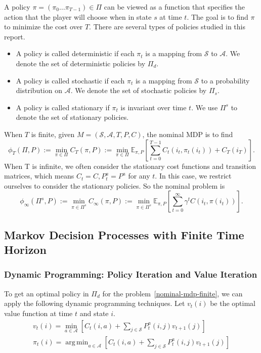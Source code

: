 \documentclass[11pt,reqno]{amsart}
\theoremstyle{definition}
\numberwithin{equation}{section}
\theoremstyle{remark}
\DeclareMathOperator*{\argmin}{arg\,min}
\begin{document}
\medskip

 A policy $\pi=(\pi_0\ldots\pi_{T-1})\in\Pi$ can be viewed as a function that specifies the action that the player will choose when in state $s$ at time $t$. The goal is to find $\pi$ to minimize the cost over $T$. There are several types of policies studied in this report. 
 \begin{itemize}
     \item A policy is called deterministic if each $\pi_t$ is a mapping from $\mathcal{S}$ to $\mathcal{A}$. We denote the set of deterministic policies by $\Pi_d$.
     \item A policy is called stochastic if each $\pi_t$ is a mapping from $\mathcal{S}$ to a probability distribution on $\mathcal{A}$. We denote the set of stochastic policies by $\Pi_s$.
     \item A policy is called stationary if $\pi_t$ is invariant over time $t$.  We use $\Pi^s$ to denote the set of stationary policies.
 \end{itemize}

\medskip

When $T$ is finite, given $M = (\mathcal{S}, \mathcal{A}, T, P, C)$, the nominal MDP is to find
\begin{equation}\label{nominal-mdp-finite}
    \phi_T(\Pi,P):=\min_{\pi\in\Pi}C_T(\pi,P):=\min_{\pi\in\Pi}\mathbb{E}_{\pi,P} \left[\sum_{t=0}^{T-1} C_t(i_t, \pi_t(i_t))+C_T(i_T)\right].
\end{equation}
When T is infinite, we often consider the stationary cost functions and transition matrices, which means $C_t=C,P^a_t=P^a$ for any $t$. In this case, we restrict ourselves to consider the stationary policies. So the nominal problem is
\begin{equation}\label{nominal-mdp-infinite}
    \phi_\infty(\Pi^s,P):=\min_{\pi\in\Pi^s}C_\infty(\pi,P):=\min_{\pi\in\Pi^s}\mathbb{E}_{\pi,P} \left[\sum_{t=0}^{\infty}\gamma^t C(i_t, \pi(i_t))\right].
\end{equation}


\subsection{Markov Decision Processes with Finite Time Horizon}


\subsubsection{Dynamic Programming: Policy Iteration and Value Iteration}
To get an optimal policy in $\Pi_d$ for the problem~\ref{nominal-mdp-finite}, we can apply the following dynamic programming techniques. Let $v_t(i)$ be the optimal value function at time $t$ and state $i$.
\begin{gather}\label{nominal-dynamic}
v_t(i)=\min_{a\in\mathcal{A}}\left[C_t(i,a)+\sum_{j\in\mathcal{S}}P^a_t(i,j)v_{t+1}(j)\right]\\
\pi_t(i)=\argmin_{a\in\mathcal{A}}\left[C_t(i,a)+\sum_{j\in\mathcal{S}}P^a_t(i,j)v_{t+1}(j)\right]
\end{gather}
\end{document}
